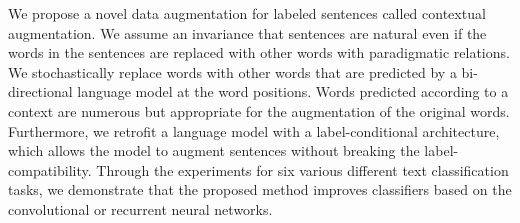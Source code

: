 We propose a novel data augmentation for labeled sentences called contextual augmentation. We assume an invariance that sentences are natural even if the words in the sentences are replaced with other words with paradigmatic relations. We stochastically replace words with other words that are predicted by a bi-directional language model at the word positions. Words predicted according to a context are numerous but appropriate for the augmentation of the original words. Furthermore, we retrofit a language model with a label-conditional architecture, which allows the model to augment sentences without breaking the label-compatibility. Through the experiments for six various different text classification tasks, we demonstrate that the proposed method improves classifiers based on the convolutional or recurrent neural networks.
